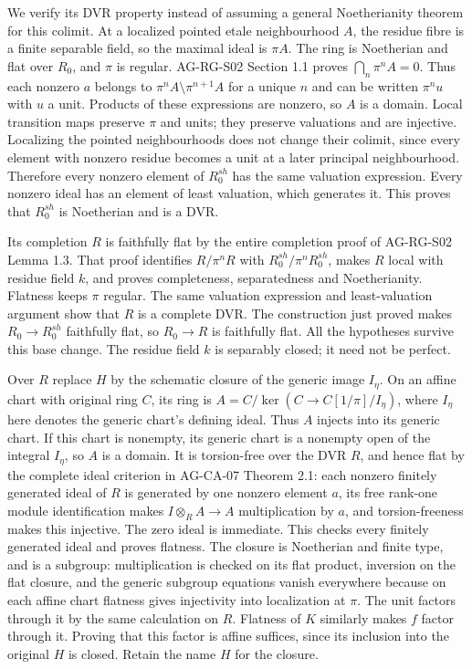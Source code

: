 \documentclass[11pt,a4paper,openany]{report}
\newcounter{none}
\begin{document}
We verify its DVR property instead of assuming a general Noetherianity theorem for this colimit. At a localized pointed etale neighbourhood \(A\), the residue fibre is a finite separable field, so the maximal ideal is \(\pi A\). The ring is Noetherian and flat over \(R_0\), and \(\pi\) is regular. AG-RG-S02 Section 1.1 proves \(\bigcap_n\pi^nA=0\). Thus each nonzero \(a\) belongs to \(\pi^nA\setminus\pi^{n+1}A\) for a unique \(n\) and can be written \(\pi^nu\) with \(u\) a unit. Products of these expressions are nonzero, so \(A\) is a domain. Local transition maps preserve \(\pi\) and units; they preserve valuations and are injective. Localizing the pointed neighbourhoods does not change their colimit, since every element with nonzero residue becomes a unit at a later principal neighbourhood. Therefore every nonzero element of \(R_0^{sh}\) has the same valuation expression. Every nonzero ideal has an element of least valuation, which generates it. This proves that \(R_0^{sh}\) is Noetherian and is a DVR.

Its completion \(R\) is faithfully flat by the entire completion proof of AG-RG-S02 Lemma 1.3. That proof identifies \(R/\pi^nR\) with \(R_0^{sh}/\pi^nR_0^{sh}\), makes \(R\) local with residue field \(k\), and proves completeness, separatedness and Noetherianity. Flatness keeps \(\pi\) regular. The same valuation expression and least-valuation argument show that \(R\) is a complete DVR. The construction just proved makes \(R_0\to R_0^{sh}\) faithfully flat, so \(R_0\to R\) is faithfully flat. All the hypotheses survive this base change. The residue field \(k\) is separably closed; it need not be perfect.

Over \(R\) replace \(H\) by the schematic closure of the generic image \(I_\eta\). On an affine chart with original ring \(C\), its ring is \(A=C/\ker(C\to C[1/\pi]/I_\eta)\), where \(I_\eta\) here denotes the generic chart's defining ideal. Thus \(A\) injects into its generic chart. If this chart is nonempty, its generic chart is a nonempty open of the integral \(I_\eta\), so \(A\) is a domain. It is torsion-free over the DVR \(R\), and hence flat by the complete ideal criterion in AG-CA-07 Theorem 2.1: each nonzero finitely generated ideal of \(R\) is generated by one nonzero element \(a\), its free rank-one module identification makes \(I\otimes_R A\to A\) multiplication by \(a\), and torsion-freeness makes this injective. The zero ideal is immediate. This checks every finitely generated ideal and proves flatness. The closure is Noetherian and finite type, and is a subgroup: multiplication is checked on its flat product, inversion on the flat closure, and the generic subgroup equations vanish everywhere because on each affine chart flatness gives injectivity into localization at \(\pi\). The unit factors through it by the same calculation on \(R\). Flatness of \(K\) similarly makes \(f\) factor through it. Proving that this factor is affine suffices, since its inclusion into the original \(H\) is closed. Retain the name \(H\) for the closure.
\end{document}
